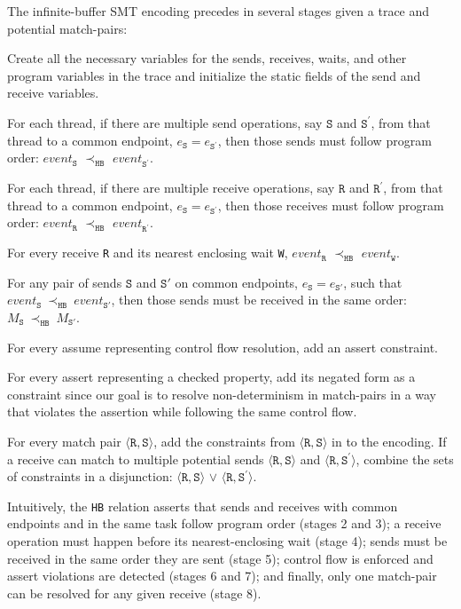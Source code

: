 The infinite-buffer SMT encoding precedes in several stages given a trace and potential match-pairs:
\begin{compactenum}
\item Create all the necessary variables for the sends, receives, waits, and other program variables in the trace and initialize the static fields of the send and receive variables.
\item For each thread, if there are multiple send operations, say $\mathtt{S}$ and $\mathtt{S^\prime}$, from that thread to a common endpoint, $e_\mathtt{S} = e_\mathtt{S^\prime}$, then those sends must follow program order: $\mathit{event}_\mathtt{S}$ $\prec_\mathtt{HB}$ $\mathit{event}_\mathtt{S^\prime}$.
\item For each thread, if there are multiple receive operations, say $\mathtt{R}$ and $\mathtt{R^\prime}$, from that thread to a common endpoint, $e_\mathtt{S} = e_\mathtt{S^\prime}$, then those receives must follow program order: $\mathit{event}_\mathtt{R}$ $\prec_\mathtt{HB}$ $\mathit{event}_\mathtt{R^\prime}$.
\item For every receive \texttt{R} and its nearest enclosing wait \texttt{W}, $\mathit{event}_\mathtt{R}$ $\prec_\mathtt{HB}$ $\mathit{event}_\mathtt{W}$.
\item For any pair of sends $\mathtt{S}$ and $\mathtt{S'}$ on common endpoints, $e_{\mathtt{S}}=e_{\mathtt{S'}}$, such that $\mathit{event}_\mathtt{S}\ \mathrm{\prec_\mathtt{HB}}\ \mathit{event}_\mathtt{S'}$, then those sends must be received in the same order: $M_{\mathtt{S}}\ \mathrm{\prec_{\mathtt{HB}}}\ M_{\mathtt{S'}}$.
\item For every assume representing control flow resolution, add an assert constraint.
\item For every assert representing a checked property, add its negated form as a constraint since our goal is to resolve non-determinism in match-pairs in a way that violates the assertion while following the same control flow.
\item For every match pair $\langle\mathtt{R}, \mathtt{S}\rangle$, add the constraints from $\langle\mathtt{R}, \mathtt{S}\rangle$ in  to the encoding. If a receive can match to multiple potential sends $\langle\mathtt{R}, \mathtt{S}\rangle$ and $\langle\mathtt{R}, \mathtt{S^\prime}\rangle$, combine the sets of constraints in a disjunction: $\langle\mathtt{R}, \mathtt{S}\rangle$ $\vee$ $\langle\mathtt{R}, \mathtt{S^\prime}\rangle$.
\end{compactenum}
Intuitively, the \texttt{HB} relation asserts that sends and receives
with common endpoints and in the same task follow program order
(stages 2 and 3); a receive operation must happen before its
nearest-enclosing wait (stage 4); sends must be received in the same
order they are sent (stage 5); control flow is enforced and assert
violations are detected (stages 6 and 7); and finally, only one
match-pair can be resolved for any given receive (stage 8).

